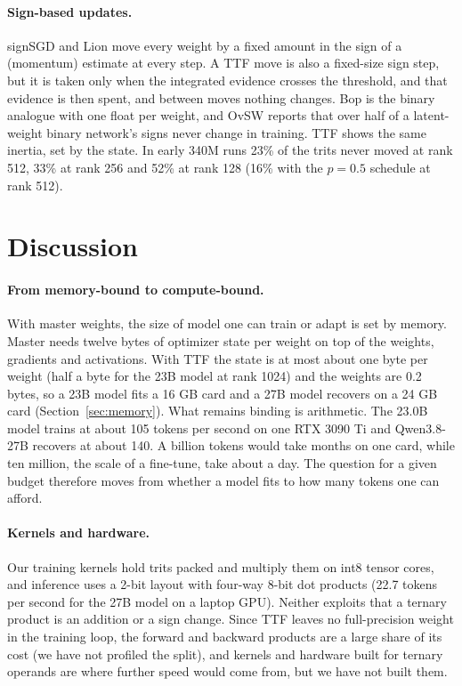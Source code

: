 \documentclass[10pt,twocolumn]{article}
\begin{document}
\paragraph{Sign-based updates.} signSGD \citep{bernstein2018signsgd} and Lion \citep{chen2023lion} move every weight by
a fixed amount in the sign of a (momentum) estimate at every step. A TTF move is also a fixed-size sign step, but it is
taken only when the integrated evidence crosses the threshold, and that evidence is then spent, and between moves nothing
changes. Bop \citep{helwegen2019latent} is the binary analogue with one float per weight, and OvSW \citep{xiang2024ovsw}
reports that over half of a latent-weight binary network's signs never change in training. TTF shows the same inertia,
set by the state. In early 340M runs 23\% of the trits never moved at rank 512, 33\% at rank 256 and 52\% at rank 128
(16\% with the $p=0.5$ schedule at rank 512).

\section{Discussion}\label{sec:discussion}
\paragraph{From memory-bound to compute-bound.} With master weights, the size of model one can train or adapt is set by
memory. Master needs twelve bytes of optimizer state per weight on top of the weights, gradients and activations. With TTF the state
is at most about one byte per weight (half a byte for the 23B model at rank 1024) and the weights are 0.2 bytes, so a 23B model fits a 16 GB card and a 27B model recovers
on a 24 GB card (Section~\ref{sec:memory}). What remains binding is arithmetic. The 23.0B model trains at about 105
tokens per second on one RTX 3090 Ti and Qwen3.8-27B recovers at about 140. A billion tokens would take months on
one card, while ten million, the scale of a fine-tune, take about a day. The question for a given budget therefore
moves from whether a model fits to how many tokens one can afford.

\paragraph{Kernels and hardware.} Our training kernels hold trits packed and multiply them on int8 tensor cores, and
inference uses a 2-bit layout with four-way 8-bit dot products (22.7 tokens per second for the 27B model on a laptop GPU).
Neither exploits that a ternary product is an addition or a sign change. Since TTF leaves no full-precision weight in
the training loop, the forward and backward products are a large share of its cost (we have not profiled the
split), and kernels and hardware built for ternary
operands are where further speed would come from, but we have not built them.
\end{document}
